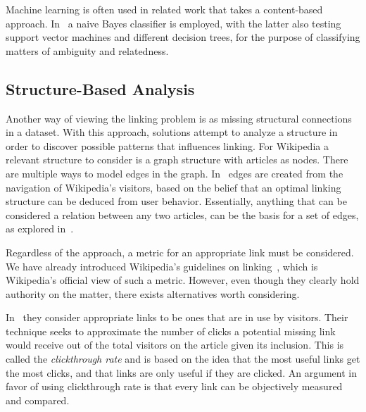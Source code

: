 Machine learning is often used in related work that takes a content-based approach. In~\cite{mihalcea2007wikify,milne2008learning} a naive Bayes classifier is employed, with the latter also testing support vector machines and different decision trees, for the purpose of classifying matters of ambiguity and relatedness.

\subsection{Structure-Based Analysis}\label{related_structural_analysis}
Another way of viewing the linking problem is as missing structural connections in a dataset. With this approach, solutions attempt to analyze a structure in order to discover possible patterns that influences linking. For Wikipedia a relevant structure to consider is a graph structure with articles as nodes. There are multiple ways to model edges in the graph. In~\cite{hyperlink-structure-using-logs} edges are created from the navigation of Wikipedia's visitors, based on the belief that an optimal linking structure can be deduced from user behavior. Essentially, anything that can be considered a relation between any two articles, can be the basis for a set of edges, as explored in~\cite{lu2011link}.

Regardless of the approach, a metric for an appropriate link must be considered. We have already introduced Wikipedia's guidelines on linking~\cite{wiki-editor-guidelines}, which is Wikipedia's official view of such a metric. However, even though they clearly hold authority on the matter, there exists alternatives worth considering.

In~\cite{hyperlink-structure-using-logs} they consider appropriate links to be ones that are in use by visitors. Their technique seeks to approximate the number of clicks a potential missing link would receive out of the total visitors on the article given its inclusion. This is called the \emph{clickthrough rate} and is based on the idea that the most useful links get the most clicks, and that links are only useful if they are clicked. An argument in favor of using clickthrough rate is that every link can be objectively measured and compared.



